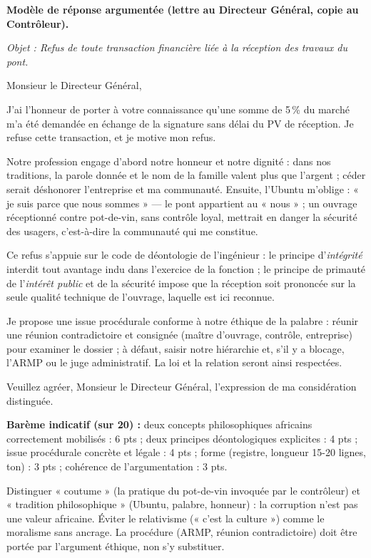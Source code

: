 \documentclass[11pt]{article}
\newcommand{\cle}[1]{{\popxbold\color{popdark}#1}}
\begin{document}
\begin{corrige}
\textbf{Modèle de réponse argumentée (lettre au Directeur Général, copie au Contrôleur).}

\emph{Objet : Refus de toute transaction financière liée à la réception des travaux du pont.}

Monsieur le Directeur Général,

J'ai l'honneur de porter à votre connaissance qu'une somme de 5\,\% du marché m'a été demandée en échange de la signature sans délai du PV de réception. Je refuse cette transaction, et je motive mon refus.

Notre profession engage d'abord notre \cle{honneur} et notre \cle{dignité} : dans nos traditions, la parole donnée et le nom de la famille valent plus que l'argent ; céder serait déshonorer l'entreprise et ma communauté. Ensuite, l'\cle{Ubuntu} m'oblige : « je suis parce que nous sommes » — le pont appartient au « nous » ; un ouvrage réceptionné contre pot-de-vin, sans contrôle loyal, mettrait en danger la sécurité des usagers, c'est-à-dire la communauté qui me constitue.

Ce refus s'appuie sur le code de déontologie de l'ingénieur : le principe d'\emph{intégrité} interdit tout avantage indu dans l'exercice de la fonction ; le principe de primauté de l'\emph{intérêt public} et de la sécurité impose que la réception soit prononcée sur la seule qualité technique de l'ouvrage, laquelle est ici reconnue.

Je propose une issue procédurale conforme à notre éthique de la \cle{palabre} : réunir une réunion contradictoire et consignée (maître d'ouvrage, contrôle, entreprise) pour examiner le dossier ; à défaut, saisir notre hiérarchie et, s'il y a blocage, l'ARMP ou le juge administratif. La loi et la relation seront ainsi respectées.

Veuillez agréer, Monsieur le Directeur Général, l'expression de ma considération distinguée.

\textbf{Barème indicatif (sur 20) :} deux concepts philosophiques africains correctement mobilisés : 6 pts ; deux principes déontologiques explicites : 4 pts ; issue procédurale concrète et légale : 4 pts ; forme (registre, longueur 15-20 lignes, ton) : 3 pts ; cohérence de l'argumentation : 3 pts.
\end{corrige}

\begin{attention}
Distinguer « coutume » (la pratique du pot-de-vin invoquée par le contrôleur) et « tradition philosophique » (Ubuntu, palabre, honneur) : la corruption n'est pas une valeur africaine. Éviter le relativisme (« c'est la culture ») comme le moralisme sans ancrage. La procédure (ARMP, réunion contradictoire) doit être portée par l'argument éthique, non s'y substituer.
\end{attention}
\end{document}
